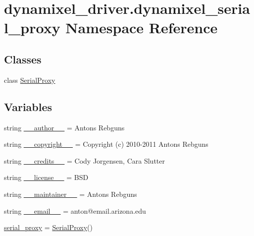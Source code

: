 \hypertarget{namespacedynamixel__driver_1_1dynamixel__serial__proxy}{}\section{dynamixel\+\_\+driver.\+dynamixel\+\_\+serial\+\_\+proxy Namespace Reference}
\label{namespacedynamixel__driver_1_1dynamixel__serial__proxy}
\subsection*{Classes}
\begin{DoxyCompactItemize}
\item 
class \hyperlink{classdynamixel__driver_1_1dynamixel__serial__proxy_1_1_serial_proxy}{Serial\+Proxy}
\end{DoxyCompactItemize}
\subsection*{Variables}
\begin{DoxyCompactItemize}
\item 
string \hyperlink{namespacedynamixel__driver_1_1dynamixel__serial__proxy_a4d52cd25d2ac6e89af5896359011a963}{\+\_\+\+\_\+author\+\_\+\+\_\+} = \textquotesingle{}Antons Rebguns\textquotesingle{}
\item 
string \hyperlink{namespacedynamixel__driver_1_1dynamixel__serial__proxy_a33a7a04490c8bf7c5169fc1eb541251f}{\+\_\+\+\_\+copyright\+\_\+\+\_\+} = \textquotesingle{}Copyright (c) 2010-\/2011 Antons Rebguns\textquotesingle{}
\item 
string \hyperlink{namespacedynamixel__driver_1_1dynamixel__serial__proxy_a9c2a1bc6d68abc32b0ea9a5f130d2fb8}{\+\_\+\+\_\+credits\+\_\+\+\_\+} = \textquotesingle{}Cody Jorgensen, Cara Slutter\textquotesingle{}
\item 
string \hyperlink{namespacedynamixel__driver_1_1dynamixel__serial__proxy_af64477b04e9780612205c944d5e6f350}{\+\_\+\+\_\+license\+\_\+\+\_\+} = \textquotesingle{}B\+SD\textquotesingle{}
\item 
string \hyperlink{namespacedynamixel__driver_1_1dynamixel__serial__proxy_a08e6c8528218d3068ef1a70d3e3dbc31}{\+\_\+\+\_\+maintainer\+\_\+\+\_\+} = \textquotesingle{}Antons Rebguns\textquotesingle{}
\item 
string \hyperlink{namespacedynamixel__driver_1_1dynamixel__serial__proxy_a874bf3766b371af503fb146419d61ff6}{\+\_\+\+\_\+email\+\_\+\+\_\+} = \textquotesingle{}anton@email.\+arizona.\+edu\textquotesingle{}
\item 
\hyperlink{namespacedynamixel__driver_1_1dynamixel__serial__proxy_ac38029cbeecf816c52f51a4e226e0ad9}{serial\+\_\+proxy} = \hyperlink{classdynamixel__driver_1_1dynamixel__serial__proxy_1_1_serial_proxy}{Serial\+Proxy}()
\end{DoxyCompactItemize}


